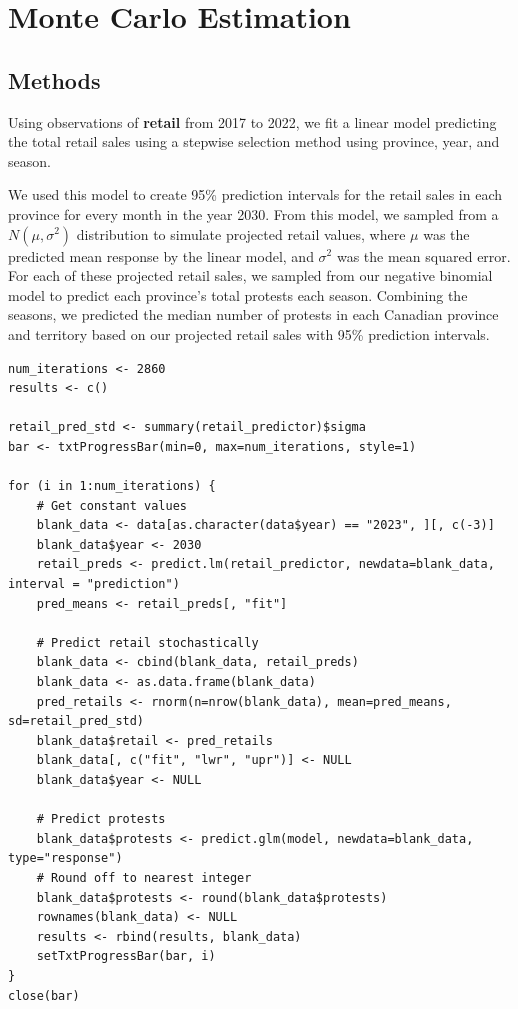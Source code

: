 \documentclass[12pt]{article}
\begin{document}
\newpage
\section{Monte Carlo Estimation}
\subsection*{Methods}
Using observations of \textbf{retail} from 2017 to 2022, we fit a linear model predicting the total retail sales using a stepwise selection method using province, year, and season.

We used this model to create 95\% prediction intervals for the retail sales in each province for every month in the year 2030. From this model, we sampled from a $N(\mu, \sigma^2)$ distribution to simulate projected retail values, where $\mu$ was the predicted mean response by the linear model, and $\sigma^2$ was the mean squared error. For each of these projected retail sales, we sampled from our negative binomial model to predict each province's total protests each season. Combining the seasons, we predicted the median number of protests in each Canadian province and territory based on our projected retail sales with 95\% prediction intervals.

\vspace{0.5cm}
\begin{lstlisting}
num_iterations <- 2860
results <- c()

retail_pred_std <- summary(retail_predictor)$sigma
bar <- txtProgressBar(min=0, max=num_iterations, style=1)

for (i in 1:num_iterations) {
    # Get constant values
    blank_data <- data[as.character(data$year) == "2023", ][, c(-3)]
    blank_data$year <- 2030
    retail_preds <- predict.lm(retail_predictor, newdata=blank_data, interval = "prediction")
    pred_means <- retail_preds[, "fit"]
    
    # Predict retail stochastically
    blank_data <- cbind(blank_data, retail_preds)
    blank_data <- as.data.frame(blank_data)
    pred_retails <- rnorm(n=nrow(blank_data), mean=pred_means, sd=retail_pred_std)
    blank_data$retail <- pred_retails
    blank_data[, c("fit", "lwr", "upr")] <- NULL
    blank_data$year <- NULL

    # Predict protests
    blank_data$protests <- predict.glm(model, newdata=blank_data, type="response")
    # Round off to nearest integer
    blank_data$protests <- round(blank_data$protests)
    rownames(blank_data) <- NULL
    results <- rbind(results, blank_data)
    setTxtProgressBar(bar, i)
}
close(bar)
\end{lstlisting}
\end{document}
